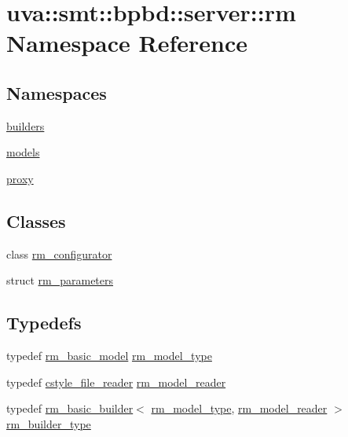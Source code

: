 \hypertarget{namespaceuva_1_1smt_1_1bpbd_1_1server_1_1rm}{}\section{uva\+:\+:smt\+:\+:bpbd\+:\+:server\+:\+:rm Namespace Reference}
\label{namespaceuva_1_1smt_1_1bpbd_1_1server_1_1rm}
\subsection*{Namespaces}
\begin{DoxyCompactItemize}
\item 
 \hyperlink{namespaceuva_1_1smt_1_1bpbd_1_1server_1_1rm_1_1builders}{builders}
\item 
 \hyperlink{namespaceuva_1_1smt_1_1bpbd_1_1server_1_1rm_1_1models}{models}
\item 
 \hyperlink{namespaceuva_1_1smt_1_1bpbd_1_1server_1_1rm_1_1proxy}{proxy}
\end{DoxyCompactItemize}
\subsection*{Classes}
\begin{DoxyCompactItemize}
\item 
class \hyperlink{classuva_1_1smt_1_1bpbd_1_1server_1_1rm_1_1rm__configurator}{rm\+\_\+configurator}
\item 
struct \hyperlink{structuva_1_1smt_1_1bpbd_1_1server_1_1rm_1_1rm__parameters}{rm\+\_\+parameters}
\end{DoxyCompactItemize}
\subsection*{Typedefs}
\begin{DoxyCompactItemize}
\item 
typedef \hyperlink{classuva_1_1smt_1_1bpbd_1_1server_1_1rm_1_1models_1_1rm__basic__model}{rm\+\_\+basic\+\_\+model} \hyperlink{namespaceuva_1_1smt_1_1bpbd_1_1server_1_1rm_a4d0c6c248c7451ba74697118cc6efa00}{rm\+\_\+model\+\_\+type}
\item 
typedef \hyperlink{classuva_1_1utils_1_1file_1_1cstyle__file__reader}{cstyle\+\_\+file\+\_\+reader} \hyperlink{namespaceuva_1_1smt_1_1bpbd_1_1server_1_1rm_a12b19feb109edabe0e0a960a258166a9}{rm\+\_\+model\+\_\+reader}
\item 
typedef \hyperlink{classuva_1_1smt_1_1bpbd_1_1server_1_1rm_1_1builders_1_1rm__basic__builder}{rm\+\_\+basic\+\_\+builder}$<$ \hyperlink{namespaceuva_1_1smt_1_1bpbd_1_1server_1_1rm_a4d0c6c248c7451ba74697118cc6efa00}{rm\+\_\+model\+\_\+type}, \hyperlink{namespaceuva_1_1smt_1_1bpbd_1_1server_1_1rm_a12b19feb109edabe0e0a960a258166a9}{rm\+\_\+model\+\_\+reader} $>$ \hyperlink{namespaceuva_1_1smt_1_1bpbd_1_1server_1_1rm_a7ffb9528c88aeafacbef2b862c461eb2}{rm\+\_\+builder\+\_\+type}
\end{DoxyCompactItemize}


